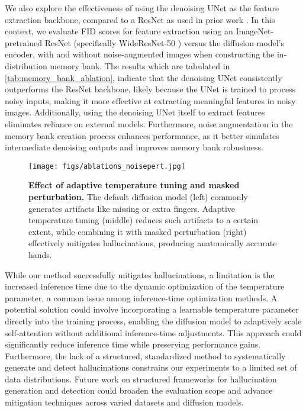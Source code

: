We also explore the effectiveness of using the denoising UNet as the feature extraction backbone, compared to a ResNet as used in prior work \citep{roth2022patchcore,kim2024tackling}. 
In this context, we evaluate FID scores for feature extraction using an ImageNet-pretrained ResNet (specifically WideResNet-50 \citep{zagoruyko2016wide}) versus the diffusion model's encoder, with and without noise-augmented images when constructing the in-distribution memory bank.
The results which are tabulated in \cref{tab:memory_bank_ablation}, indicate that the denoising UNet consistently outperforms the ResNet backbone, likely because the UNet is trained to process noisy inputs, making it more effective at extracting meaningful features in noisy images. 
Additionally, using the denoising UNet itself to extract features eliminates reliance on external models.
Furthermore, noise augmentation in the memory bank creation process enhances performance, as it better simulates intermediate denoising outputs and improves memory bank robustness.

\begin{figure}[tbp]
    \centering
    \texttt{[image: figs/ablations\_noisepert.jpg]}
    \caption{\textbf{Effect of adaptive temperature tuning and masked perturbation.} The default diffusion model (left) commonly generates artifacts like missing or extra fingers. Adaptive temperature tuning (middle) reduces such artifacts to a certain extent, while combining it with masked perturbation (right) effectively mitigates hallucinations, producing anatomically accurate hands.}
    \label{fig:abl_tempnoise}
    \vspace{-10pt}
\end{figure}

While our method successfully mitigates hallucinations, a limitation is the increased inference time due to the dynamic optimization of the temperature parameter, a common issue among inference-time optimization methods. 
A potential solution could involve incorporating a learnable temperature parameter directly into the training process, enabling the diffusion model to adaptively scale self-attention without additional inference-time adjustments. 
This approach could significantly reduce inference time while preserving performance gains.
Furthermore, the lack of a structured, standardized method to systematically generate and detect hallucinations constrains our experiments to a limited set of data distributions. 
Future work on structured frameworks for hallucination generation and detection could broaden the evaluation scope and advance mitigation techniques across varied datasets and diffusion models.
